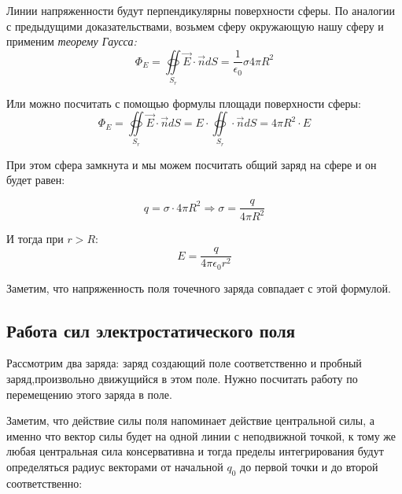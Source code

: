 \documentclass[../main.tex]{subfiles}
\begin{document}
Линии напряженности будут перпендикулярны поверхности сферы.
По аналогии с предыдущими доказательствами, возьмем сферу окружающую нашу сферу и применим \textit{теорему Гаусса:}
\[\Phi_E = \oiint\limits_{S_r} \vec{E} \cdot  \vec{n} dS = \frac{1}{\epsilon_0}\sigma 4 \pi R^2\]

Или можно посчитать с помощью формулы площади поверхности сферы:
\[ \Phi_E = \oiint\limits_{S_r} \vec{E} \cdot \vec{n} dS = E \cdot \oiint\limits_{S_r} \cdot \vec{n} dS = 4 \pi R^2 \cdot E\]

При этом сфера замкнута и мы можем посчитать общий заряд на сфере и он будет равен:

\[ q = \sigma \cdot 4\pi R^2 \Rightarrow \sigma = \frac{q}{4\pi R^2}\]

И тогда при $r > R :$
\[ E = \frac{q}{4 \pi \epsilon_0 r^2} \]

Заметим, что напряженность поля точечного заряда совпадает с этой формулой.

\subsection{Работа сил электростатического поля}

Рассмотрим два заряда: заряд создающий поле соответственно и пробный заряд,произвольно движущийся в этом поле. Нужно посчитать работу по перемещению этого заряда в поле.

\vspace{5px}

Заметим, что действие силы поля напоминает действие центральной силы, а именно что вектор силы будет на одной линии с неподвижной точкой, к тому же любая центральная сила консервативна и тогда пределы интегрирования будут определяться радиус векторами от начальной $q_0$ до первой точки и до второй соответственно:
\end{document}
